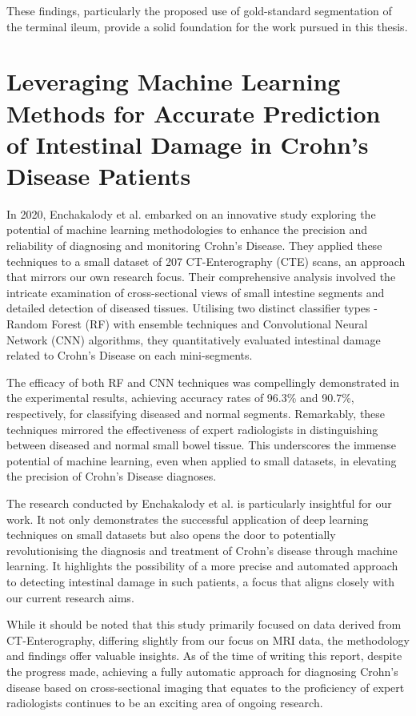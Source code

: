 These findings, particularly the proposed use of gold-standard segmentation of the terminal ileum, provide a solid foundation for the work pursued in this thesis.

\section{Leveraging Machine Learning Methods for Accurate Prediction of Intestinal Damage in Crohn's Disease Patients}

In 2020, Enchakalody et al. \cite{enchakalody2020machine} embarked on an innovative study exploring the potential of machine learning methodologies to enhance the precision and reliability of diagnosing and monitoring Crohn's Disease. They applied these techniques to a small dataset of 207 CT-Enterography (CTE) scans, an approach that mirrors our own research focus. Their comprehensive analysis involved the intricate examination of cross-sectional views of small intestine segments and detailed detection of diseased tissues. Utilising two distinct classifier types - Random Forest (RF) with ensemble techniques and Convolutional Neural Network (CNN) algorithms, they quantitatively evaluated intestinal damage related to Crohn's Disease on each mini-segments.

The efficacy of both RF and CNN techniques was compellingly demonstrated in the experimental results, achieving accuracy rates of 96.3\% and 90.7\%, respectively, for classifying diseased and normal segments. Remarkably, these techniques mirrored the effectiveness of expert radiologists in distinguishing between diseased and normal small bowel tissue. This underscores the immense potential of machine learning, even when applied to small datasets, in elevating the precision of Crohn's Disease diagnoses.

The research conducted by Enchakalody et al. is particularly insightful for our work. It not only demonstrates the successful application of deep learning techniques on small datasets but also opens the door to potentially revolutionising the diagnosis and treatment of Crohn's disease through machine learning. It highlights the possibility of a more precise and automated approach to detecting intestinal damage in such patients, a focus that aligns closely with our current research aims.

While it should be noted that this study primarily focused on data derived from CT-Enterography, differing slightly from our focus on MRI data, the methodology and findings offer valuable insights. As of the time of writing this report, despite the progress made, achieving a fully automatic approach for diagnosing Crohn's disease based on cross-sectional imaging that equates to the proficiency of expert radiologists continues to be an exciting area of ongoing research.
